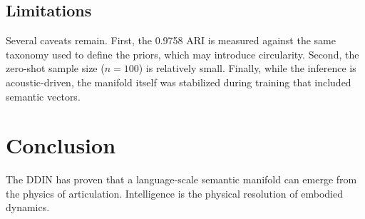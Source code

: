 \documentclass{article}
\begin{document}
\subsection{Limitations}
Several caveats remain. First, the 0.9758 ARI is measured against the same taxonomy used to define the priors, which may introduce circularity. Second, the zero-shot sample size ($n=100$) is relatively small. Finally, while the inference is acoustic-driven, the manifold itself was stabilized during training that included semantic vectors.

\section{Conclusion}
The DDIN has proven that a language-scale semantic manifold can emerge from the physics of articulation. Intelligence is the physical resolution of embodied dynamics.



\end{document}
